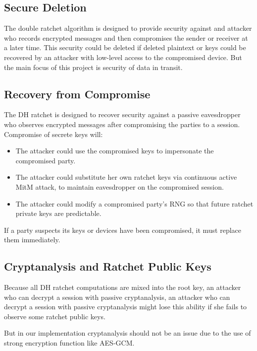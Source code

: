 \subsection{Secure Deletion}
\label{subsec:SecureDeletion}

The double ratchet algorithm is designed to provide security against and attacker who records encrypted messages and then compromises the sender or receiver at a later time. This security could be deleted if deleted plaintext or keys could be recovered by an attacker with low-level access to the compromised device. But the main focus of this project is security of data in transit.

\subsection{Recovery from Compromise}
\label{subsec:RecoveryFromCompromise}

The DH ratchet is designed to recover security against a passive eavesdropper who observes encrypted messages after compromising the parties to a session. Compromise of secrete keys will:

\begin{itemize}
  \item The attacker could use the compromised keys to impersonate the compromised party.
  \item The attacker could substitute her own ratchet keys via continuous active MitM attack, to maintain eavesdropper on the compromised session.
  \item The attacker could modify a compromised party's RNG so that future ratchet private keys are predictable.
\end{itemize}

If a party suspects its keys or devices have been compromised, it must replace them immediately.

\subsection{Cryptanalysis and Ratchet Public Keys}
\label{subsec:CryptanalysisandRatchetPublicKeys}

Because all DH ratchet computations are mixed into the root key, an attacker who can decrypt a session with passive cryptanalysis, an attacker who can decrypt a session with passive cryptanalysis might lose this ability if she fails to observe some ratchet public keys.

But in our implementation cryptanalysis should not be an issue due to the use of strong encryption function like AES-GCM.

